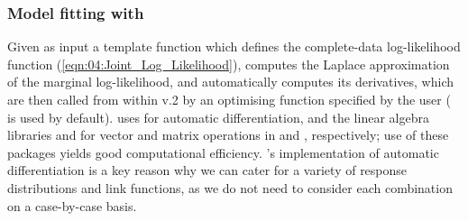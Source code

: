 \documentclass[nojss]{jss}
\newcommand{\fct}[1]{\code{#1()}}
\def\mbf#1{{%
\mathchoice%
{\hbox{\boldmath$\displaystyle{#1}$}}%
{\hbox{\boldmath$\textstyle{#1}$}}%
{\hbox{\boldmath$\scriptstyle{#1}$}}%
{\hbox{\boldmath$\scriptscriptstyle{#1}$}}%
}}
\def\vec{\mbf}
\newcommand{\Gau}{{\text{Gau}}}
\newcommand{\tp}{{\!\scriptscriptstyle \top}}
\begin{document}
%
%
%



\subsubsection[Model fitting with TMB]{Model fitting with }

Given as input a  template function which defines the complete-data log-likelihood function (\ref{eqn:04:Joint_Log_Likelihood}),  \citep{Kristensen_2016_TMB} computes the Laplace approximation of the marginal log-likelihood, and automatically computes its derivatives, which are then called from within  v.2 by an optimising function specified by the user (\fct{nlminb} is used by default). 
  uses  \citep{CppAD_Package} for automatic differentiation, and the linear algebra libraries  \citep{Eigen} and  \citep{Matrix_Package} for vector and matrix operations in  and , respectively; use of these packages yields good computational efficiency. 
's implementation of automatic differentiation is a key reason why we can cater for a variety of response distributions and link functions, as we do not need to consider each combination on a case-by-case basis.
\end{document}
